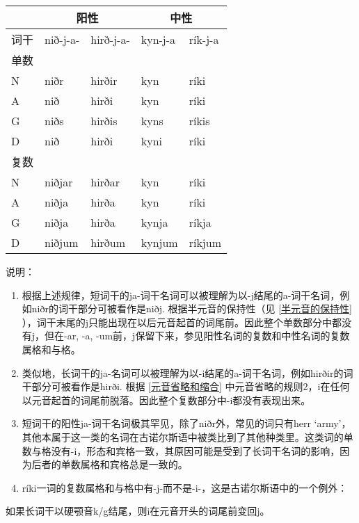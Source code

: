 \begin{longtable}{lllll}
    \toprule
         & \multicolumn{2}{c}{\textbf{阳性}} & \multicolumn{2}{c}{\textbf{中性}}                     \\
    \midrule
    \endhead
    \bottomrule
    \endfoot
    词干 & nið-j-a-                 & hirð-j-a-                & kyn-j-a & rík-j-a \\
    单数 &                          &                          &         &         \\
    N    & niðr                     & hirðir                   & kyn     & ríki    \\
    A    & nið                      & hirði                    & kyn     & ríki    \\
    G    & niðs                     & hirðis                   & kyns    & ríkis   \\
    D    & nið                      & hirði                    & kyni    & ríki    \\
    复数 &                          &                          &         &         \\
    N    & niðjar                   & hirðar                   & kyn     & ríki    \\
    A    & niðja                    & hirða                    & kyn     & ríki    \\
    G    & niðja                    & hirða                    & kynja   & ríkja   \\
    D    & niðjum                   & hirðum                   & kynjum  & ríkjum  \\
  \end{longtable}

  说明：

  \begin{enumerate}[1)]

    \item
          根据上述规律，短词干的ja-词干名词可以被理解为以-j结尾的a-词干名词，例如niðr的词干部分可被看作是niðj.
          根据半元音的保持性（见 \ref{半元音的保持性} ），词干末尾的j只能出现在以后元音起首的词尾前。因此整个单数部分中都没有j，但在-ar,
          -a, -um前，j保留下来，参见阳性名词的复数和中性名词的复数属格和与格。
    \item
          类似地，长词干的ja-名词可以被理解为以-i结尾的a-词干名词，例如hirðir的词干部分可被看作是hirði.
          根据 \ref{元音省略和缩合} 中元音省略的规则2，i在任何以元音起首的词尾前脱落。因此整个复数部分中-i都没有表现出来。
    \item
          短词干的阳性ja-词干名词极其罕见，除了niðr外，常见的词只有herr
          `army'，其他本属于这一类的名词在古诺尔斯语中被类比到了其他种类里。这类词的单数与格没有-i，形态和宾格一致，其原因可能是受到了长词干名词的影响，因为后者的单数属格和宾格总是一致的。
    \item
          ríki一词的复数属格和与格中有-j-而不是-i-，这是古诺尔斯语中的一个例外：
  \end{enumerate}
  \begin{info}
    如果长词干以硬颚音k/g结尾，则i在元音开头的词尾前变回j。
  \end{info}

